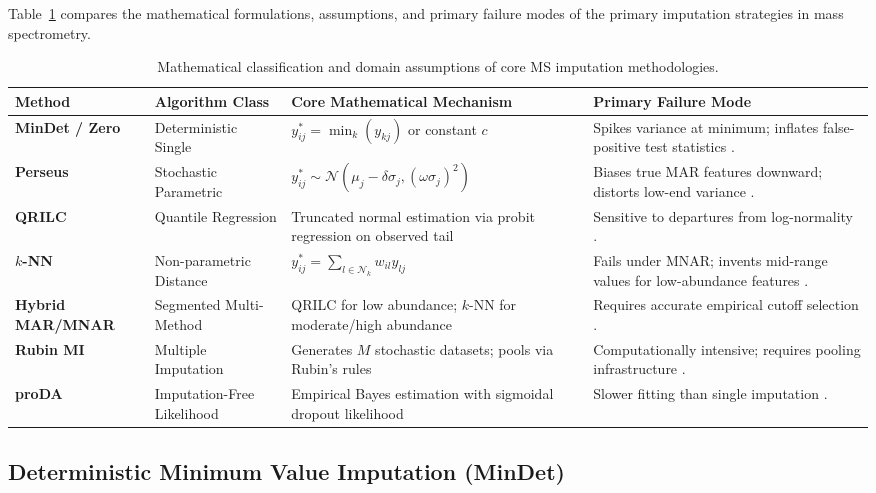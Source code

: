 \documentclass[11pt,oneside]{book}
\begin{document}
Table~\ref{tab:imputation_comparison} compares the mathematical formulations, assumptions, and primary failure modes of the primary imputation strategies in mass spectrometry.

\begin{table}[htbp]
\centering
\caption{Mathematical classification and domain assumptions of core MS imputation methodologies.}
\label{tab:imputation_comparison}
\small
\begin{tabularx}{\textwidth}{l p{3.2cm} p{4.0cm} X}
\toprule
\textbf{Method} & \textbf{Algorithm Class} & \textbf{Core Mathematical Mechanism} & \textbf{Primary Failure Mode} \\
\midrule
\textbf{MinDet / Zero} & Deterministic Single & $y_{ij}^* = \min_k(y_{kj})$ or constant $c$ & Spikes variance at minimum; inflates false-positive test statistics \cite{lazar2016accounting}. \\
\addlinespace
\textbf{Perseus} & Stochastic Parametric & $y_{ij}^* \sim \mathcal{N}(\mu_j - \delta \sigma_j, (\omega \sigma_j)^2)$ & Biases true MAR features downward; distorts low-end variance \cite{tyanova2016perseus}. \\
\addlinespace
\textbf{QRILC} & Quantile Regression & Truncated normal estimation via probit regression on observed tail & Sensitive to departures from log-normality \cite{lazar2016accounting}. \\
\addlinespace
\textbf{$k$-NN} & Non-parametric Distance & $y_{ij}^* = \sum_{l \in \mathcal{N}_k} w_{il} y_{lj}$ & Fails under MNAR; invents mid-range values for low-abundance features \cite{hastie2001impute}. \\
\addlinespace
\textbf{Hybrid MAR/MNAR} & Segmented Multi-Method & QRILC for low abundance; $k$-NN for moderate/high abundance & Requires accurate empirical cutoff selection \cite{palstrom2020imputation}. \\
\addlinespace
\textbf{Rubin MI} & Multiple Imputation & Generates $M$ stochastic datasets; pools via Rubin's rules & Computationally intensive; requires pooling infrastructure \cite{rubin1987multiple, barnard1999small}. \\
\addlinespace
\textbf{proDA} & Imputation-Free Likelihood & Empirical Bayes estimation with sigmoidal dropout likelihood & Slower fitting than single imputation \cite{ahlmann2020proda}. \\
\bottomrule
\end{tabularx}
\end{table}

\subsection{Deterministic Minimum Value Imputation (MinDet)}
\end{document}
